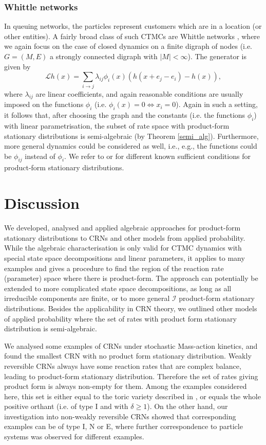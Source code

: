 \documentclass{amsart}
\theoremstyle{definition}
\theoremstyle{remark}
\theoremstyle{Conjecture/open problem}
\theoremstyle{assumption}
\theoremstyle{conjecture}
\def\la{\lambda}
\def\I{\mathcal{I}}
\def\la{\lambda}
\numberwithin{equation}{section}
\begin{document}
\subsubsection{Whittle networks}
In queuing networks, the particles represent customers which are in a location (or other entities). A fairly broad class of such CTMCs are Whittle networks \cite{serfozo}, where we again focus on the case of closed dynamics on a finite digraph of nodes (i.e. $G=(M,E)$ a strongly connected digraph with $|M|<\infty$). The generator is given by
$$\mathcal{L}h(x)=\sum_{i\to j} \la_{ij}\phi_{i}(x)(h(x+e_j-e_i)-h(x)),$$
where $ \la_{ij}$ are linear coefficients, and again reasonable conditions are usually imposed on the functions $\phi_{i}$ (i.e. $\phi_{i}(x)=0\iff x_i=0$). Again in such a setting, it follows that, after choosing the graph and the constants (i.e. the functions $\phi_{i}$) with linear parametrisation, the subset of rate space with product-form stationary distributions is semi-algebraic (by Theorem \ref{semi_alg}). Furthermore, more general dynamics could be considered as well, i.e., e.g., the functions could be $\phi_{ij}$ instead of $\phi_{i}$. We refer to \cite[Theorem 1.15]{serfozo} or \cite[IV Section 2, Section 5]{asmussen2003applied} for different known sufficient conditions for product-form stationary distributions.


\section{Discussion}\label{disc}
We developed, analysed and applied algebraic approaches for product-form stationary distributions to CRNs and other models from applied probability. While the algebraic characterisation is only valid for CTMC dynamics with special state space decompositions and linear parameters, it applies to many examples and gives a procedure to find the region of the reaction rate (parameter) space where there is product-form. The approach can potentially be extended to more complicated state space decompositions, as long as all irreducible components are finite, or to more general $\I$ product-form stationary distributions. Besides the applicability in CRN theory, we outlined other models of applied probability where the set of rates with product form stationary distribution is semi-algebraic.

We analysed some examples of CRNs under stochastic Mass-action kinetics, and found the smallest CRN with no product form stationary distribution. Weakly reversible CRNs always have some reaction rates that are complex balance, leading to product-form stationary distribution. Therefore the set of rates giving product form is always non-empty for them. Among the examples considered here, this set is either equal to the toric variety described in \cite{sturmfels}, or equals the whole  positive orthant (i.e. of type I and with  $\delta\geq 1$). On the other hand, our investigation into non-weakly reversible CRNs showed that corresponding examples can be of type I, N or E, where further correspondence to particle systems was observed for different examples.
\end{document}

